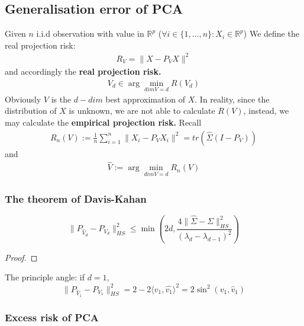 \subsection{Generalisation error of PCA}
Given $n$ i.i.d observation with value in $\mathbb{R}^p$ ($\forall i \in \{1, \dots, n \}: X_i \in \mathbb{R}^p$)  We define the real projection risk:
\begin{align*}
	R_V = \|X - P_V X \|^2
\end{align*}
and accordingly the \textbf{real projection risk.}
\begin{align*}
	V_d \in \arg\min_{dim V = d} R(V_d)
\end{align*}
Obviously $V$ is the $d-dim$ best approximation of $X$. In reality, since the distribution of $X$ is unknown, we are not able to calculate $R(V)$, instead, we may calculate the \textbf{empirical projection risk.} Recall
\begin{align*}
	R_n (V) := \frac{1}{n} \sum_{i = 1}^n \|X_i - P_V X_i\|^2 = tr(\hat{\Sigma}(I - P_V))
\end{align*}
and 
\begin{align*}
	\hat{V} := \arg\min_{dimV = d} R_n(V)
\end{align*}


\subsubsection*{The theorem of Davis-Kahan}


\begin{theorem}
	\begin{equation} \label{PCA: David-Kahan}
		\| P_{\hat{V}_d} - P_{V_d} \|_{HS}^2 \leq \min (2d, \frac{4 \| \hat{\Sigma} - \Sigma \|_{HS}^2}{(\lambda_d - \lambda_{d-1} )^2} )
	\end{equation}
\end{theorem}

\begin{proof}
\end{proof}

\begin{remark}
The principle angle: if $d = 1$, 
\begin{equation*}
	\| P_{\hat{V}_1} - P_{V_1} \|_{HS}^2 = 2 - 2 \langle v_1, \hat{v_1}  \rangle^2 = 2\sin^2(v_1, \hat{v}_1)
\end{equation*}	
\end{remark}

\subsubsection*{Excess risk of PCA}

